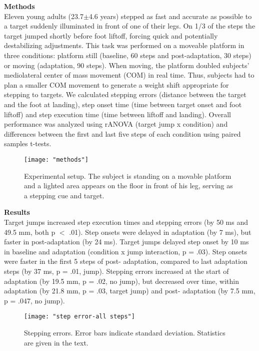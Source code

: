 \textbf{Methods}\\
Eleven young adults (23.7$\pm$4.6 years) stepped as fast and accurate as possible to a target suddenly illuminated in front of one of their legs. On 1/3 of the steps the target jumped shortly before foot liftoff, forcing quick and potentially destabilizing adjustments. This task was performed on a moveable platform in three conditions: platform still (baseline, 60 steps and post-adaptation, 30 steps) or moving (adaptation, 90 steps). When moving, the platform doubled subjects’ mediolateral center of mass movement (COM) in real time. Thus, subjects had to plan a smaller COM movement to generate a weight shift appropriate for stepping to targets.
We calculated stepping errors (distance between the target and the foot at landing), step onset time (time between target onset and foot liftoff) and step execution time (time between liftoff and landing). Overall performance was analyzed using rANOVA (target jump x condition) and differences between the first and last five steps of each condition using paired samples t-tests.

\begin{figure*}[!ht]
	\centering
	\texttt{[image: "methods"]}
	\caption{Experimental setup. The subject is standing on a movable platform and a lighted area appears on the floor in front of his leg, serving as a stepping cue and target.}
	\label{fig:expSetup}
	\vspace{-4 mm}
\end{figure*}

\textbf{Results}\\
Target jumps increased step execution times and stepping errors (by 50 ms and 49.5 mm, both p $<$ .01).  Step onsets were delayed in adaptation (by 7 ms), but faster in post-adaptation (by 24 ms). Target jumps delayed step onset by 10 ms in baseline and adaptation (condition x jump interaction, p = .03). Step onsets were faster in the first 5 steps of post- adaptation, compared to last adaptation steps (by 37 ms, p = .01, jump). Stepping errors increased at the start of adaptation (by 19.5 mm, p = .02, no jump), but decreased over time, within adaptation (by 21.8 mm, p = .03, target jump) and post- adaptation (by 7.5 mm, p = .047, no jump).

\begin{figure*}[!ht]
	\centering
	\texttt{[image: "step error-all steps"]}
	\caption{Stepping errors. Error bars indicate standard deviation. Statistics are given in the text.}
	\label{fig:stepErrorAll}
\end{figure*}

